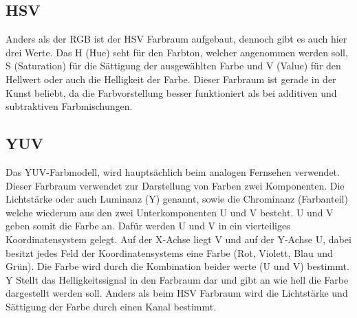   \subsection{HSV}\label{s.hsv}
Anders als der RGB ist der HSV Farbraum aufgebaut, dennoch gibt es auch hier drei Werte. Das H (Hue) seht für den Farbton, welcher angenommen werden soll, S (Saturation) für die Sättigung der ausgewählten Farbe und V (Value) für den Hellwert oder auch die Helligkeit der Farbe. Dieser Farbraum ist gerade in der Kunst beliebt, da die Farbvorstellung besser funktioniert als bei additiven und subtraktiven Farbmischungen.
  \subsection{YUV}\label{s.lab}
Das YUV-Farbmodell, wird hauptsächlich beim analogen Fernsehen verwendet. Dieser Farbraum verwendet zur Darstellung von Farben zwei Komponenten. Die Lichtstärke oder auch Luminanz (Y) genannt, sowie die Chrominanz (Farbanteil) welche wiederum aus den zwei Unterkomponenten U und V besteht. U und V geben somit die Farbe an. Dafür werden U und V in ein vierteiliges Koordinatensystem gelegt. Auf der X-Achse liegt V und auf der Y-Achse U, dabei besitzt jedes Feld der Koordinatensystems eine Farbe (Rot, Violett, Blau und Grün). Die Farbe wird durch die Kombination beider werte (U und V) bestimmt. Y Stellt das Helligkeitssignal in den Farbraum dar und gibt an wie hell die Farbe dargestellt werden soll. Anders als beim HSV Farbraum wird die Lichtstärke und Sättigung der Farbe durch einen Kanal bestimmt. 
